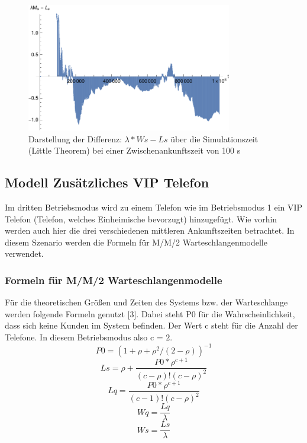 \begin{figure}[htpb]
	\centering
	\includegraphics[width=0.8\textwidth]{abbildungen/1_Phone_VIP/Arrival_100_Serve_100_dur_1000000_Skip_0/LittleSystem.pdf}
	\caption{Darstellung der Differenz: $\lambda * Ws - Ls$ über die Simulationszeit (Little Theorem) bei einer Zwischenankunftszeit von 100 s}
	\label{fig:1_Phone_VIP_100_Little}
\end{figure}




\subsection{Modell \glqq Zusätzliches VIP Telefon\grqq}
Im dritten Betriebsmodus wird zu einem Telefon wie im Betriebsmodus 1 ein VIP Telefon (Telefon, welches Einheimische bevorzugt) hinzugefügt. Wie vorhin werden auch hier die drei verschiedenen mittleren Ankunftszeiten betrachtet. In diesem Szenario werden die Formeln für M/M/2 Warteschlangenmodelle verwendet.
\subsubsection{Formeln für M/M/2 Warteschlangenmodelle}
\label{Formeln2}
Für die theoretischen Größen und Zeiten des Systems bzw. der Warteschlange werden folgende Formeln genutzt [3]. Dabei steht P0 für die Wahrscheinlichkeit, dass sich keine Kunden im System befinden. Der Wert c steht für die Anzahl der Telefone. In diesem Betriebsmodus also c = $2$.
\begin{equation}
P0=(1+\rho+\rho^2/(2-\rho))^{-1}
\end{equation}
\begin{equation}
Ls=\rho + \frac{P0*\rho^{c+1}}{(c-\rho)!(c-\rho)^2}
\end{equation}
\begin{equation}
Lq=\frac{P0*\rho^{c+1}}{(c-1)!(c-\rho)^2}
\end{equation}
\begin{equation}
Wq=\frac{Lq}{\lambda}
\end{equation}
\begin{equation}
Ws=\frac{Ls}{\lambda}
\end{equation}
